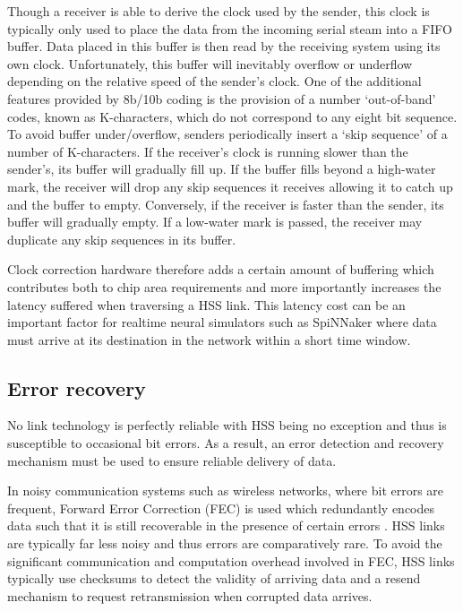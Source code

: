 			Though a receiver is able to derive the clock used by the sender, this
			clock is typically only used to place the data from the incoming serial
			steam into a FIFO buffer. Data placed in this buffer is then read by the
			receiving system using its own clock. Unfortunately, this buffer will
			inevitably overflow or underflow depending on the relative speed of the
			sender's clock. One of the additional features provided by 8b/10b coding
			is the provision of a number `out-of-band' codes, known as K-characters,
			which do not correspond to any eight bit sequence. To avoid buffer
			under/overflow, senders periodically insert a `skip sequence' of a number
			of K-characters.  If the receiver's clock is running slower than the
			sender's, its buffer will gradually fill up. If the buffer fills beyond a
			high-water mark, the receiver will drop any skip sequences it receives
			allowing it to catch up and the buffer to empty. Conversely, if the
			receiver is faster than the sender, its buffer will gradually empty.  If a
			low-water mark is passed, the receiver may duplicate any skip sequences in
			its buffer.
			
			Clock correction hardware therefore adds a certain amount of buffering
			which contributes both to chip area requirements and more importantly
			increases the latency suffered when traversing a HSS link. This latency
			cost can be an important factor for realtime neural simulators such as
			SpiNNaker where data must arrive at its destination in the network within
			a short time window.
		
		\subsection{Error recovery}
			
			No link technology is perfectly reliable with HSS being no exception and
			thus is susceptible to occasional bit errors. As a result, an error
			detection and recovery mechanism must be used to ensure reliable delivery
			of data.
			
			In noisy communication systems such as wireless networks, where bit errors
			are frequent, Forward Error Correction (FEC) is used which redundantly
			encodes data such that it is still recoverable in the presence of certain
			errors \cite{hamming50}. HSS links are typically far less noisy and thus
			errors are comparatively rare.  To avoid the significant communication and
			computation overhead involved in FEC, HSS links typically use checksums to
			detect the validity of arriving data and a resend mechanism to request
			retransmission when corrupted data arrives.
			
